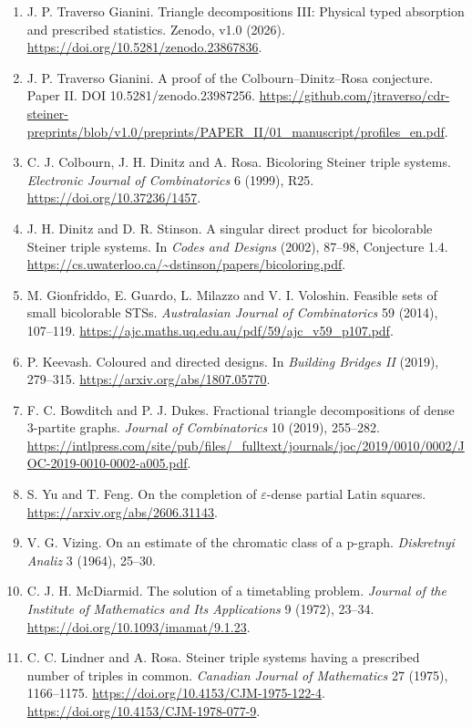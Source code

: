 \documentclass[english,11pt,a4paper]{article}
\providecommand{\tightlist}{\setlength{\itemsep}{0pt}\setlength{\parskip}{0pt}}
\begin{document}
\begin{enumerate}
\def\labelenumi{\arabic{enumi}.}
\tightlist
\item
  J. P. Traverso Gianini. Triangle decompositions III: Physical typed absorption and prescribed statistics. Zenodo, v1.0 (2026). \url{https://doi.org/10.5281/zenodo.23867836}.
\item
  J. P. Traverso Gianini. A proof of the Colbourn--Dinitz--Rosa conjecture. Paper II. DOI 10.5281/zenodo.23987256. \url{https://github.com/jtraverso/cdr-steiner-preprints/blob/v1.0/preprints/PAPER_II/01_manuscript/profiles_en.pdf}.
\item
  C. J. Colbourn, J. H. Dinitz and A. Rosa. Bicoloring Steiner triple systems. \emph{Electronic Journal of Combinatorics} 6 (1999), R25. \url{https://doi.org/10.37236/1457}.
\item
  J. H. Dinitz and D. R. Stinson. A singular direct product for bicolorable Steiner triple systems. In \emph{Codes and Designs} (2002), 87--98, Conjecture 1.4. \url{https://cs.uwaterloo.ca/~dstinson/papers/bicoloring.pdf}.
\item
  M. Gionfriddo, E. Guardo, L. Milazzo and V. I. Voloshin. Feasible sets of small bicolorable STSs. \emph{Australasian Journal of Combinatorics} 59 (2014), 107--119. \url{https://ajc.maths.uq.edu.au/pdf/59/ajc_v59_p107.pdf}.
\item
  P. Keevash. Coloured and directed designs. In \emph{Building Bridges II} (2019), 279--315. \url{https://arxiv.org/abs/1807.05770}.
\item
  F. C. Bowditch and P. J. Dukes. Fractional triangle decompositions of dense 3-partite graphs. \emph{Journal of Combinatorics} 10 (2019), 255--282. \url{https://intlpress.com/site/pub/files/_fulltext/journals/joc/2019/0010/0002/JOC-2019-0010-0002-a005.pdf}.
\item
  S. Yu and T. Feng. On the completion of \(\varepsilon\)-dense partial Latin squares. \url{https://arxiv.org/abs/2606.31143}.
\item
  V. G. Vizing. On an estimate of the chromatic class of a p-graph. \emph{Diskretnyi Analiz} 3 (1964), 25--30.
\item
  C. J. H. McDiarmid. The solution of a timetabling problem. \emph{Journal of the Institute of Mathematics and Its Applications} 9 (1972), 23--34. \url{https://doi.org/10.1093/imamat/9.1.23}.
\item
  C. C. Lindner and A. Rosa. Steiner triple systems having a prescribed number of triples in common. \emph{Canadian Journal of Mathematics} 27 (1975), 1166--1175. \url{https://doi.org/10.4153/CJM-1975-122-4}. \url{https://doi.org/10.4153/CJM-1978-077-9}.

\end{enumerate}
\end{document}
